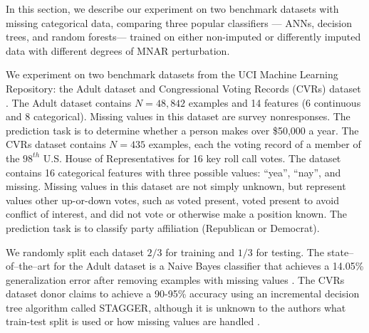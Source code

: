 \documentclass[10pt]{book}
\theoremstyle{definition}
\begin{document}
\par


\setcounter{chapter}{3}
\setcounter{equation}{0} %

In this section, we describe our experiment on two benchmark datasets with missing categorical data, comparing three popular classifiers --- ANNs, decision trees, and random forests--- trained on either non-imputed or differently imputed data with different degrees of MNAR perturbation.

\par
{}

We experiment on two benchmark datasets from the UCI Machine Learning Repository: the Adult dataset and Congressional Voting Records (CVRs) dataset \citep{Lichman2013}. The Adult dataset contains $N=48,842$ examples and 14 features (6 continuous and 8 categorical). Missing values in this dataset are survey nonresponses. The prediction task is to determine whether a person makes over \$50,000 a year. The CVRs dataset contains $N=435$ examples, each the voting record of a member of the $98^{th}$ U.S. House of Representatives for 16 key roll call votes. The dataset contains 16 categorical features with three possible values: ``yea'', ``nay'', and missing. Missing values in this dataset are not simply unknown, but represent values other up-or-down votes, such as voted present, voted present to avoid conflict of interest, and did not vote or otherwise make a position known. The prediction task is to classify party affiliation (Republican or Democrat). 

We randomly split each dataset $2/3$ for training and $1/3$ for testing. The state--of--the--art for the Adult dataset is a Naive Bayes classifier that achieves a 14.05\% generalization error after removing examples with missing values \citep{kohavi1996}. The CVRs dataset donor claims to achieve a 90-95\% accuracy using an incremental decision tree algorithm called STAGGER, although it is unknown to the authors what train-test split is used or how missing values are handled \citep{schlimmer1987,schlimmer1986}.

\par
{}
\end{document}
